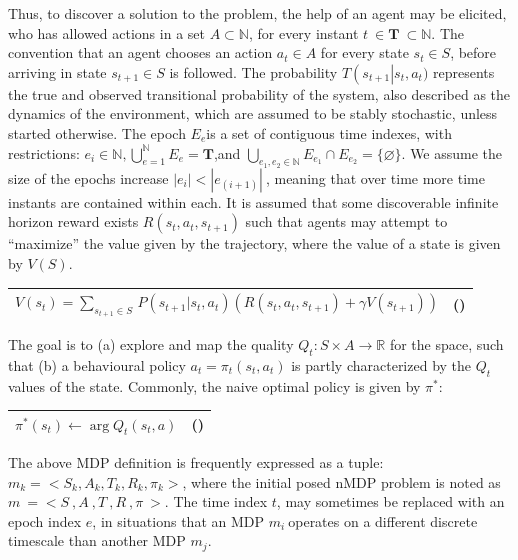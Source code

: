 \documentclass[]{article}
\begin{document}
Thus, to discover a solution to the problem, the help of an agent may be
elicited, who has allowed actions in a set \(A\mathbb{\subset N}\), for
every instant \(t\  \in \mathbf{T}\mathbb{\  \subset N}\). The
convention that an agent chooses an action \(a_{t} \in A\) for every
state \(s_{t} \in S\), before arriving in state \(s_{t + 1} \in S\) is
followed. The probability \(T\left( s_{t + 1} \right|s_{t},a_{t})\)
represents the true and observed transitional probability of the system,
also described as the dynamics of the environment, which are assumed to
be stably stochastic, unless started otherwise. The epoch \(E_{e}\)is a
set of contiguous time indexes, with restrictions:
\(e_{i}\mathbb{\in N,}\bigcup_{e = 1}^{\mathbb{N}}E_{e} = \mathbf{T}\),and
\(\bigcup_{e_{1},e_{2}\mathbb{\in N}}^{\ }{E_{e_{1}} \cap E_{e_{2}}} = \{\varnothing\}\).
We assume the size of the epochs increase
\(\left| e_{i} \right| < \left| e_{(i + 1)} \right|\ \), meaning that
over time more time instants are contained within each. It is assumed
that some discoverable infinite horizon reward exists
\(R\left( s_{t},a_{t},s_{t + 1} \right)\) such that agents may attempt
to ``maximize'' the value given by the trajectory, where the value of a
state is given by \(V\left( S \right).\)

\begin{longtable}[]{@{}ll@{}}
\toprule
\(V\left( s_{t} \right) = \sum_{s_{t + 1} \in S\ }^{\ }{P\left( s_{t + 1}|s_{t},a_{t} \right)\left( R\left( s_{t},a_{t},s_{t + 1} \right) + \gamma V\left( s_{t + 1} \right) \right)}\)
& ()\tabularnewline
\bottomrule
\end{longtable}

The goal is to (a) explore and map the quality
\(Q_{t}:S \times A\mathbb{\rightarrow R}\) for the space, such that (b)
a behavioural policy \(a_{t} = \pi_{t}(s_{t},a_{t})\) is partly
characterized by the \(Q_{t}\) values of the state. Commonly, the naive
optimal policy is given by \(\pi_{\ }^{*}\):

\begin{longtable}[]{@{}ll@{}}
\toprule
\(\pi_{\ }^{*}\left( s_{t} \right) \leftarrow \arg{Q_{t}(s_{t},a)}\) &
()\tabularnewline
\bottomrule
\end{longtable}

The above MDP definition is frequently expressed as a tuple:
\(m_{k} = < S_{k},A_{k},T_{k},R_{k},\pi_{k} >\), where the initial posed
nMDP problem is noted as
\(m_{\ } = < S_{\ },A_{\ },T_{\ },R_{\ },\pi_{\ } >\). The time index
\(t\), may sometimes be replaced with an epoch index \(e\), in
situations that an MDP \(m_{i}\ \)operates on a different discrete
timescale than another MDP \(m_{j}\).
\end{document}
